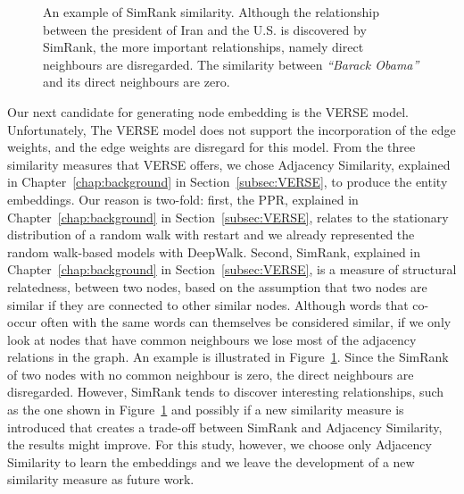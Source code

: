 \begin{figure}
\centering 
\resizebox{0.50\textwidth}{0.35\textwidth}{      

}
\caption{An example of SimRank similarity. Although the relationship between the president of Iran and the U.S. is discovered by SimRank, the more important relationships, namely direct neighbours are disregarded. The similarity between \emph{``Barack Obama''} and its direct neighbours are zero.}
\label{fig:simrank}
\end{figure}

Our next candidate for generating node embedding is the VERSE model. Unfortunately, The VERSE model does not support the incorporation of the edge weights, and the edge weights are disregard for this model. From the three similarity measures that VERSE offers, we chose Adjacency Similarity, explained in Chapter~\ref{chap:background} in Section~\ref{subsec:VERSE}, to produce the entity embeddings. Our reason is two-fold: first, the PPR, explained in Chapter~\ref{chap:background} in Section~\ref{subsec:VERSE}, relates to the stationary distribution of a random walk with restart and we already represented the random walk-based models with DeepWalk.
Second, SimRank, explained in Chapter~\ref{chap:background} in Section~\ref{subsec:VERSE}, is a measure of structural relatedness, between two nodes, based on the assumption that two nodes are similar if they are connected to other similar nodes. Although words that co-occur often with the same words can themselves be considered similar, if we only look at nodes that have common neighbours we lose most of the adjacency relations in the graph. An example is illustrated in Figure~\ref{fig:simrank}. Since the SimRank of two nodes with no common neighbour is zero, the direct neighbours are disregarded. However, SimRank tends to discover interesting relationships, such as the one shown in Figure~\ref{fig:simrank} and possibly if a new similarity measure is introduced that creates a trade-off between SimRank and Adjacency Similarity, the results might improve. For this study, however, we choose only Adjacency Similarity to learn the embeddings and we leave the development of a new similarity measure as future work. 
